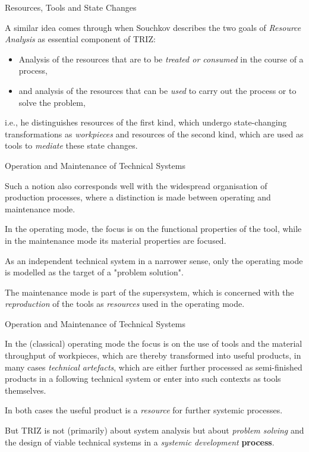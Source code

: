 \documentclass{beamer}
\begin{document}
\begin{frame}{Resources, Tools and State Changes}

A similar idea comes through when Souchkov describes the two goals of
\emph{Resource Analysis} as essential component of TRIZ:
\begin{itemize}
\item Analysis of the resources that are to be \emph{treated or consumed} in
  the course of a process,
\item and analysis of the resources that can be \emph{used} to carry out the
  process or to solve the problem,
\end{itemize}
i.e., he distinguishes resources of the first kind, which undergo
state-changing transformations as \emph{workpieces} and resources of the
second kind, which are used as tools to \emph{mediate} these state changes.

\end{frame}

\begin{frame}{Operation and Maintenance of Technical Systems} 

Such a notion also corresponds well with the widespread organisation of
production processes, where a distinction is made between operating and
maintenance mode.

In the operating mode, the focus is on the functional properties of the tool,
while in the maintenance mode its material properties are focused.

As an independent technical system in a narrower sense, only the
operating mode is modelled as the target of a "problem solution".

The maintenance mode is part of the supersystem, which is concerned with the
\emph{reproduction} of the tools as \emph{resources} used in the operating
mode.

\end{frame}

\begin{frame}{Operation and Maintenance of Technical Systems} 

In the (classical) operating mode the focus is on the use of tools and
the material throughput of workpieces, which are thereby transformed into
useful products, in many cases \emph{technical artefacts}, which are either
further processed as semi-finished products in a following technical system or
enter into such contexts as tools themselves.

In both cases the useful product is a \emph{resource} for further systemic
processes.

But TRIZ is not (primarily) about system analysis but about \emph{problem
  solving} and the design of viable technical systems in a \emph{systemic
  development} \textbf{process}.

\end{frame}
\end{document}
